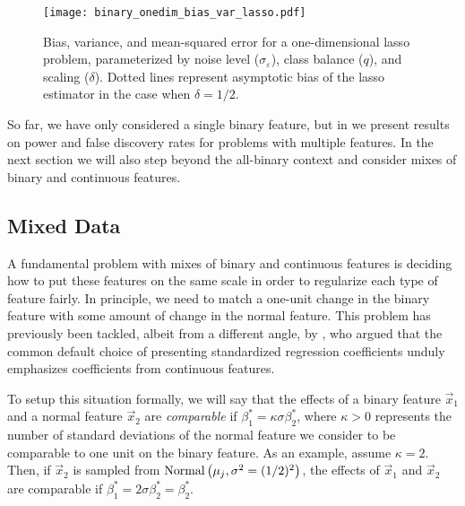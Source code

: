 \begin{figure}[htb]
  \centering
  \texttt{[image: binary\_onedim\_bias\_var\_lasso.pdf]}
  \caption{%
    Bias, variance, and mean-squared error for a one-dimensional lasso problem,
    parameterized by noise level (\(\sigma_\varepsilon\)), class balance (\(q\)), and
    scaling (\(\delta\)). Dotted lines represent asymptotic bias of the lasso
    estimator in the case when \(\delta = 1/2\).}
  \label{fig:bias-var-onedim-lasso}
\end{figure}

So far, we have only considered a single binary feature, but in
 we present results on power and false discovery rates for
problems with multiple features. In the next section we will also step beyond the
all-binary context and consider mixes of binary and continuous features.

\subsection{Mixed Data}%
\label{sec:mixed-data}

A fundamental problem with mixes of binary and continuous features is deciding how to put
these features on the same scale in order to regularize each type of feature fairly. In
principle, we need to match a one-unit change in the binary feature with some amount of
change in the normal feature. This problem has previously been tackled, albeit from a
different angle, by \citet{gelman2008}, who argued that the common default choice of
presenting standardized regression coefficients unduly emphasizes coefficients from
continuous features.

To setup this situation formally, we will say that the effects of a binary feature
\(\vec{x}_1\) and a normal feature \(\vec{x}_2\) are \emph{comparable} if \(\beta^*_1 =
\kappa \sigma \beta^*_2\), where \(\kappa > 0\) represents the number of standard
deviations of the normal feature we consider to be comparable to one unit on the binary
feature. As an example, assume \(\kappa = 2\). Then, if \(\vec{x}_2\) is sampled from
\(\operatorname{Normal}\left(\mu_j, \sigma^2 = (1/2)^2\right)\), the effects of \(\vec{x}_1\) and
\(\vec{x}_2\) are comparable if \(\beta_1^* = 2\sigma \beta_2^* = \beta_2^*\).

